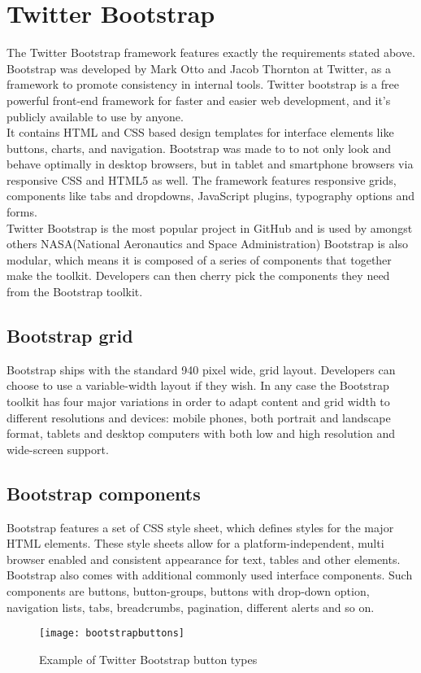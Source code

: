 \section{Twitter Bootstrap}
The Twitter Bootstrap framework\cite{twitterbootstrap} features exactly the requirements stated above. Bootstrap was developed by Mark Otto and Jacob Thornton at Twitter, as a framework to promote consistency in internal tools\cite{buildingbootstrap}. Twitter bootstrap is a free powerful front-end framework for faster and easier web development, and it's publicly available to use by anyone.\\ It contains HTML and CSS based design templates for interface elements like buttons, charts, and navigation. Bootstrap was made to to not only look and behave optimally in desktop browsers, but in tablet and smartphone browsers via responsive CSS and HTML5 as well. The framework features responsive grids, components like tabs and dropdowns, JavaScript plugins, typography options and forms. \\
Twitter Bootstrap is the most popular project in GitHub and is used by amongst others NASA(National Aeronautics and Space Administration)\cite{nasa}
Bootstrap is also modular, which means it is composed of a series of components that together make the toolkit. Developers can then cherry pick the components they need from the Bootstrap toolkit. \\

\subsection{Bootstrap grid}
Bootstrap ships with the standard 940 pixel wide, grid layout. Developers can choose to use a variable-width layout if they wish. In any case the Bootstrap toolkit has four major variations in order to adapt content and grid width to different resolutions and devices: mobile phones, both portrait and landscape format, tablets and desktop computers with both low and high resolution and wide-screen support.

\subsection{Bootstrap components}
Bootstrap features a set of CSS style sheet, which defines styles for the major HTML elements. These style sheets allow for a platform-independent, multi browser enabled and consistent appearance for text, tables and other elements. \\
Bootstrap also comes with additional commonly used interface components. Such components are buttons, button-groups, buttons with drop-down option, navigation lists, tabs, breadcrumbs, pagination, different alerts and so on. 
\begin{figure}[h!]
\centering
	\texttt{[image: bootstrapbuttons]}
\caption{Example of Twitter Bootstrap button types}
\label{bootstrapbutton}
\end{figure}

